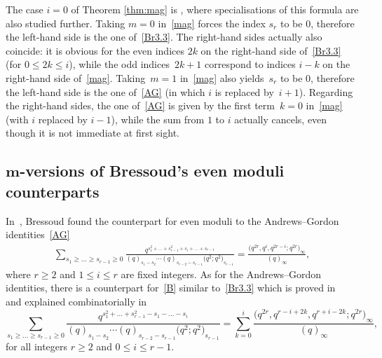 \documentclass[pdftex]{sigma}
\numberwithin{equation}{section}
\begin{document}
The case $i=0$ of Theorem \ref{thm:mag} is \cite[Theorem~2.3, equation~(2.3)]{J}, where specialisations of this formula are also studied further. Taking $m=0$ in~\eqref{mag} forces the index $s_r$ to be $0$, therefore the left-hand side is the one of~\eqref{Br3.3}. The right-hand sides actually also coincide: it is obvious for the even indices $2k$ on the right-hand side of~\eqref{Br3.3} (for $0\leq 2k\leq i$), while the odd indices~${2k+1}$ correspond to indices $i-k$ on the right-hand side of~\eqref{mag}. Taking~${m=1}$ in~\eqref{mag} also yields~$s_r$ to be $0$, therefore the left-hand side is the one of~\eqref{AG} (in which $i$ is replaced by~${i+1}$). Regarding the right-hand sides, the one of~\eqref{AG} is given by the first term~${k=0}$ in~\eqref{mag} (with $i$ replaced by $i-1$), while the sum from $1$ to $i$ actually cancels, even though it is not immediate at first sight.

\subsection[m-versions of Bressoud's even moduli counterparts]{$\boldsymbol{m}$-versions of Bressoud's even moduli counterparts}

In~\cite{B}, Bressoud found the counterpart for even moduli to the Andrews--Gordon identities~\eqref{AG}
\begin{gather}
\sum_{s_1\geq\dots\geq s_{r-1}\geq0}\frac{q^{s_1^2+\dots+s_{r-1}^2+s_{i}+\dots+s_{r-1}}}{(q)_{s_1-s_2}\cdots(q)_{s_{r-2}-s_{r-1}}\bigl(q^2;q^2\bigr)_{s_{r-1}}}
=\frac{\bigl(q^{2r},q^{i},q^{2r-i};q^{2r}\bigr)_\infty}{(q)_\infty},\label{B}
\end{gather}
where $r \geq 2$ and $1\leq i\leq r$ are fixed integers. As for the Andrews--Gordon identities, there is a counterpart for~\eqref{B} similar to~\eqref{Br3.3} which is proved in~\cite[equation~(3.5)]{Br80} and explained combinatorially in~\cite{DJK}
\begin{equation}\label{Br3.5}
\sum_{s_1\geq\dots\geq s_{r-1}\geq0}\frac{q^{s_1^2+\dots+s_{r-1}^2-s_1-\dots-s_i}}{(q)_{s_1-s_2}\cdots(q)_{s_{r-2}-s_{r-1}}\bigl(q^2;q^2\bigr)_{s_{r-1}}} =\sum_{k=0}^{i}\frac{\bigl(q^{2r},q^{r-i+2k},q^{r+i-2k};q^{2r}\bigr)_\infty}{(q)_\infty},
\end{equation}
for all integers $r \geq 2$ and $0\leq i\leq r-1$.
\end{document}
